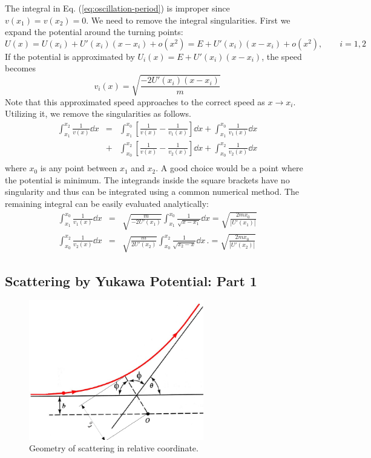 The integral in Eq. (\ref{eq:oscillation-period}) is improper since $v(x_1)=v(x_2)=0$.  We need to remove the integral singularities. First we expand the potential around the turning points:
%
\begin{equation}
U(x) = U(x_i) + U'(x_i) (x-x_i) + o(x^2)=E + U'(x_i) (x-x_i) + o(x^2), \qquad i=1,2
\end{equation}
%
If the potential is approximated by $U_i(x) = E+U'(x_i)(x-x_i)$, the speed becomes 
%
\begin{equation}
v_i(x) = \sqrt{\frac{-2U'(x_i)(x-x_i)}{m}}
\end{equation}
%
Note that this approximated speed approaches to the correct speed as $x \rightarrow x_i$.  Utilizing it, we remove the singularities as follows.
%
\begin{eqnarray}
\int_{x_1}^{x_2} \frac{1}{v(x)} \dd{x} &=& \int_{x_1}^{x_0} \left [\frac{1}{v(x)}-\frac{1}{v_1(x)}\right ] \dd{x} 
+ \int_{x_1}^{x_0} \frac{1}{v_1(x)} \dd{x} \\
&+& \int_{x_0}^{x_2} \left [\frac{1}{v(x)}-\frac{1}{v_2(x)}\right ] \dd{x} + \int_{x_0}^{x_2} \frac{1}{v_2(x)} \dd{x}\\
\end{eqnarray}
%
where $x_0$ is any point between $x_1$ and $x_2$.  A good choice would be a point where the potential is minimum.  The integrands inside the square brackets have no singularity and thus can be integrated using a common numerical method. The remaining integral can be easily evaluated analytically:
%
\begin{eqnarray}
\int_{x_1}^{x_0} \frac{1}{v_1(x)} \dd{x} &=& \sqrt{\frac{m}{-2 U'(x_1)}} \int_{x_1}^{x_0} \frac{1}{\sqrt{x-x_1}} \dd{x}
=\sqrt{\frac{2 m x_0}{|U'(x_1)|}} \\
\int_{x_0}^{x_2} \frac{1}{v_2(x)} \dd{x} &=& \sqrt{\frac{m}{2 U'(x_2)}} \int_{x_0}^{x_2} \frac{1}{\sqrt{x_2-x}} \dd{x}\, .
=\sqrt{\frac{2 m x_0}{|U'(x_2)|}}
\end{eqnarray}
%


\subsection{Scattering by Yukawa Potential: Part 1}
\label{sec:scattering1}

\begin{figure}
\centerline{\includegraphics[width=3.0in]{03.integrals/scattering-diagram.pdf}}
\caption{Geometry of scattering in relative coordinate.}
\label{fig:scattering}
\end{figure}

